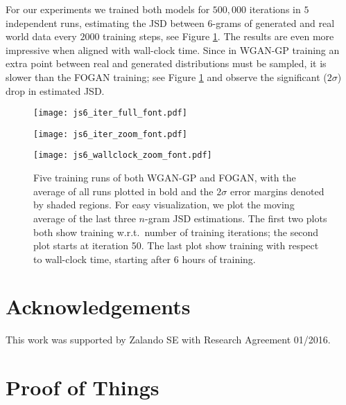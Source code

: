 \documentclass{article}
\begin{document}
 For our experiments we trained both models for $500,000$ iterations in $5$ independent runs, estimating the JSD between $6$-grams
 of generated and real world data every $2000$ training steps, see Figure \ref{F:jsd_6}.
 The results are even more impressive when
 aligned with wall-clock time. Since in WGAN-GP training an extra point between real and generated distributions must be sampled, it is slower
 than the FOGAN training; see Figure \ref{F:jsd_6}
 and observe the significant ($2\sigma$) drop in estimated JSD.
 
 \begin{figure}
\begin{minipage}{\linewidth}
\centering
\texttt{[image: js6\_iter\_full\_font.pdf]}
\end{minipage}
\begin{minipage}{\linewidth}
\centering
\texttt{[image: js6\_iter\_zoom\_font.pdf]}
\end{minipage}
\begin{minipage}{\linewidth}
\centering
\texttt{[image: js6\_wallclock\_zoom\_font.pdf]}
\end{minipage}
\caption{
Five training runs of both WGAN-GP and FOGAN, with the average of all runs plotted in bold and
the $2\sigma$ error margins denoted by shaded regions.
For easy visualization, we plot the moving average of the last three $n$-gram JSD estimations.
The first two plots both show training w.r.t.\ number of training iterations; the second plot starts at iteration 50.
The last plot show training with respect to wall-clock time, starting after 6 hours of training.
}\label{F:jsd_6}
\end{figure}
\clearpage

 \section*{Acknowledgements}
 This work was supported by Zalando SE with Research Agreement 01/2016.
 
 
 
 \clearpage{}\appendix
 \onecolumn
 \section{Proof of Things}\label{S:proof_of_things}
\end{document}

